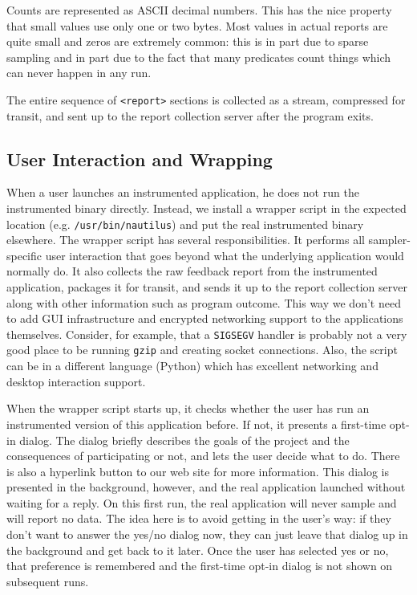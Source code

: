 \documentclass[10pt,twocolumn]{article}
\begin{document}
Counts are represented as ASCII decimal numbers.  This has the nice
property that small values use only one or two bytes.  Most values
in actual reports are quite small and zeros are extremely common: this
is in part due to sparse sampling and in part due to the fact that
many predicates count things which can never happen in any run.

The entire sequence of \texttt{<report>} sections is collected as a
stream, compressed for transit, and sent up to the report collection
server after the program exits.

\subsection{User Interaction and Wrapping}

When a user launches an instrumented application, he does not run the
instrumented binary directly.  Instead, we install a wrapper script in
the expected location (e.g. \texttt{/usr/bin/nautilus}) and put the
real instrumented binary elsewhere.  The wrapper script has several
responsibilities.  It performs all sampler-specific user interaction
that goes beyond what the underlying application would normally do.
It also collects the raw feedback report from the instrumented
application, packages it for transit, and sends it up to the report
collection server along with other information such as program
outcome.  This way we don't need to add GUI infrastructure and
encrypted networking support to the applications themselves.
Consider, for example, that a \texttt{SIGSEGV} handler is probably not
a very good place to be running \texttt{gzip} and creating socket
connections.  Also, the script can be in a different language (Python)
which has excellent networking and desktop interaction support.

When the wrapper script starts up, it checks whether the user has run
an instrumented version of this application before.  If not, it
presents a first-time opt-in dialog.  The dialog briefly describes the
goals of the project and the consequences of participating or not, and
lets the user decide what to do.  There is also a hyperlink button to
our web site for more information.  This dialog is presented in the
background, however, and the real application launched without waiting
for a reply.  On this first run, the real application will never
sample and will report no data.  The idea here is to avoid getting in
the user's way: if they don't want to answer the yes/no dialog now,
they can just leave that dialog up in the background and get back to
it later.  Once the user has selected yes or no, that preference is
remembered and the first-time opt-in dialog is not shown on subsequent
runs.
\end{document}
